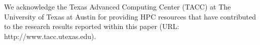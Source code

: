 \documentclass{article}
\begin{document}
We acknowledge the Texas Advanced Computing Center (TACC) at The University of Texas at Austin for providing 
HPC resources that have contributed to the research results reported within this paper (URL: http://www.tacc.utexas.edu).



\end{document}
